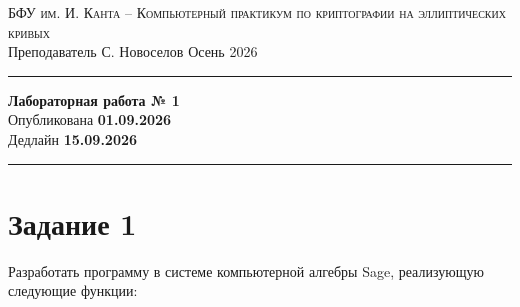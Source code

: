 \documentclass[11pt]{exam}
\theoremstyle{definition}
\begin{document}
	
	{\noindent
		\textsc{БФУ им. И. Канта -- Компьютерный практикум по криптографии на эллиптических кривых }\\[5pt]
		Преподаватель {С. Новоселов}   \hfill{Осень 2026\\}
	\hrule
	\begin{center}
		{\LARGE\textbf{
				Лабораторная работа № 1 \\[5pt]
		}} 
			Опубликована \textbf{01.09.2026} \\[5pt] 
			Дедлайн \textbf{15.09.2026}
		
	\end{center}
	\hrule \vspace{5mm}
	
	\thispagestyle{empty}


\section*{Задание 1}
    Разработать программу в системе компьютерной алгебры Sage, реализующую следующие функции:

}
\end{document}
